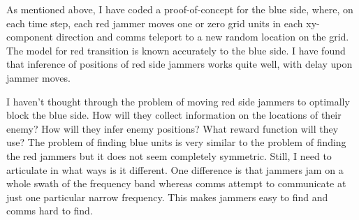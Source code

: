 \documentclass{article}
\begin{document}
As mentioned above, I have coded a proof-of-concept for the blue side,
where, on each time step, each red jammer moves one or zero grid units
in each xy-component direction and comms teleport to a new random
location on the grid.  The model for red transition is known
accurately to the blue side.  I have found that inference of positions
of red side jammers works quite well, with delay upon jammer moves.

I haven't thought through the problem of moving red side jammers to
optimally block the blue side.  How will they collect information on
the locations of their enemy?  How will they infer enemy positions?
What reward function will they use?  The problem of finding blue units
is very similar to the problem of finding the red jammers but it does
not seem completely symmetric.  Still, I need to articulate in what
ways is it different.  One difference is that jammers jam on a whole
swath of the frequency band whereas comms attempt to communicate at
just one particular narrow frequency.  This makes jammers easy to find
and comms hard to find.
\end{document}
